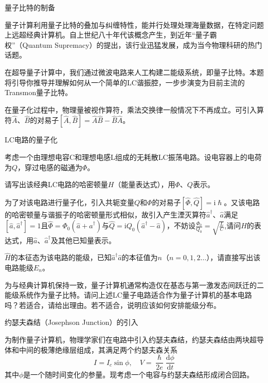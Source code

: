 \documentclass[answer]{cphos}
\begin{document}
\begin{problem}[50]{量子比特的制备}

\begin{problemstatement}
量子计算利用量子比特的叠加与纠缠特性，能并行处理处理海量数据，在特定问题上远超经典计算机。自上世纪八十年代该概念产生，到近年“量子霸权”（Quantum Supremacy）的提出，该行业迅猛发展，成为当今物理科研的热门话题。

在超导量子计算中，我们通过微波电路来人工构建二能级系统，即量子比特。本题将引导你推导并理解如何从一个简单的LC谐振腔，一步步演变为目前主流的Transmon量子比特。

在量子化过程中，物理量被视作算符，乘法交换律一般情况下不再成立。可引入算符$\hat{A}$、$\hat{B}$的对易子$\left[ \hat{A},\hat{B}\right]=\hat{A}\hat{B}-\hat{B}\hat{A}$。

 LC电路的量子化

考虑一个由理想电容C和理想电感L组成的无耗散LC振荡电路。设电容器上的电荷为$Q$，穿过电感的磁通为$\varPhi$。

请写出该经典LC电路的哈密顿量$H$（能量表达式），用$\varPhi$、$Q$表示。

为了对该电路进行量子化，引入共轭变量$Q$和$\varPhi$的对易子$\left[ \hat{\varPhi},\hat{Q}\right]=\mathrm{i}\hslash$。又该电路的哈密顿量与谐振子的哈密顿量形式相似，故引入产生湮灭算符$\hat{a}^\dagger$、$\hat{a}$满足$\left[ \hat{a},\hat{a}^\dagger \right]=1$且$\hat{\varPhi}=\varPhi_0 \left(\hat{a}+\hat{a}^\dagger\right)$与$\hat{Q}=\mathrm{i}Q_0 \left(\hat{a}^\dagger-\hat{a}\right)$，不妨设$\frac{\varPhi_0}{Q_0}=\sqrt{\frac{L}{C}}$,请问$\hat{H}$的表达式，用$\hat{a}$、$\hat{a}^\dagger$及其他已知量表示。

$\hat{H}$的本征态为该电路的能级，已知$\hat{a}^\dagger \hat{a}$的本征值为$n$（$n=0,1,2\dots$），请直接写出该电路能级$E_n$。

为与经典计算机保持一致，量子计算机通常构造仅在基态与第一激发态间跃迁的二能级系统作为量子比特。请问上述LC量子电路适合作为量子计算机的基本电路吗？若适合，请给出理由。若不适合，说明应该如何安排能级分布。

 约瑟夫森结（Josephson Junction）的引入

为制作量子计算机，物理学家们在电路中引入约瑟夫森结，约瑟夫森结由两块超导体和中间的极薄绝缘层组成，其满足两个约瑟夫森关系
\begin{equation}
    I=I_c\sin\phi,\quad
    V=\frac{\hslash}{2e} \frac{\mathrm{d}\phi}{\mathrm{d}t}
\end{equation}
其中$\phi$是一个随时间变化的参量。现考虑一个电容与约瑟夫森结形成闭合回路。


\end{problemstatement}
\end{problem}
\end{document}
